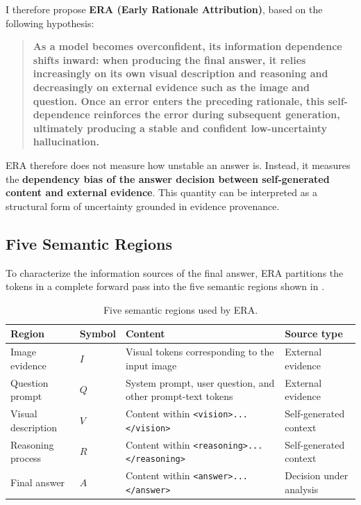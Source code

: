 I therefore propose \textbf{ERA (Early Rationale Attribution)}, based on the following hypothesis:

\begin{quote}
\centering
\textbf{As a model becomes overconfident, its information dependence shifts inward: when producing the final answer, it relies increasingly on its own visual description and reasoning and decreasingly on external evidence such as the image and question. Once an error enters the preceding rationale, this self-dependence reinforces the error during subsequent generation, ultimately producing a stable and confident low-uncertainty hallucination.}
\end{quote}

ERA therefore does not measure how unstable an answer is. Instead, it measures the \textbf{dependency bias of the answer decision between self-generated content and external evidence}. This quantity can be interpreted as a structural form of uncertainty grounded in evidence provenance.

\subsection{Five Semantic Regions}
\label{subsec:era_regions}

To characterize the information sources of the final answer, ERA partitions the tokens in a complete forward pass into the five semantic regions shown in .

\begin{table}[H]
\centering
\caption{Five semantic regions used by ERA.}
\label{tab:era_regions}
\small
\setlength{\tabcolsep}{5pt}
\renewcommand{\arraystretch}{1.18}
\begin{tabularx}{0.94\linewidth}{@{}L{2.5cm}C{1.4cm}Y L{3.1cm}@{}}
\toprule
\textbf{Region} & \textbf{Symbol} & \textbf{Content} & \textbf{Source type} \\
\midrule
Image evidence & $I$ & Visual tokens corresponding to the input image & External evidence \\
Question prompt & $Q$ & System prompt, user question, and other prompt-text tokens & External evidence \\
Visual description & $V$ & Content within \texttt{<vision>...\allowbreak</vision>} & Self-generated context \\
Reasoning process & $R$ & Content within \texttt{<reasoning>...\allowbreak</reasoning>} & Self-generated context \\
Final answer & $A$ & Content within \texttt{<answer>...\allowbreak</answer>} & Decision under analysis \\
\bottomrule
\end{tabularx}
\end{table}

